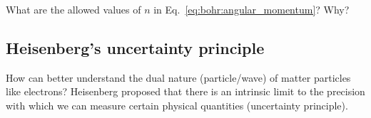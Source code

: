 \documentclass[../Main/chem331-notes.tex]{subfiles}
\begin{document}

\begin{exercise}
What are the allowed values of $n$ in Eq.~\eqref{eq:bohr:angular_momentum}? Why?
\end{exercise}

\subsection{Heisenberg's uncertainty principle}
How can better understand the dual nature (particle/wave) of matter particles like electrons?
Heisenberg proposed that there is an intrinsic limit to the precision with which we can measure certain physical quantities (uncertainty principle).
\end{document}
